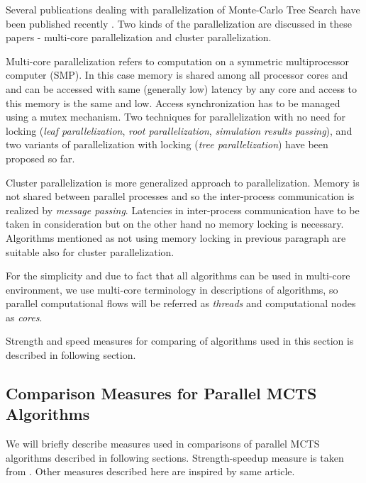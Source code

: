 Several publications dealing with parallelization of Monte-Carlo Tree Search have been published
recently \cites{Cazenave2007}{Chaslot2008}{Teytaud2008}. Two kinds of the parallelization are
discussed in these papers - multi-core parallelization and cluster parallelization.

Multi-core parallelization refers to computation on a symmetric multiprocessor computer (SMP). In
this case memory is shared among all processor cores and and can be accessed with same
(generally low) latency by any core  and access to this memory is the same and low.
Access synchronization has to be managed using a mutex mechanism. Two techniques for
parallelization with no need for locking (\emph{leaf parallelization}, \emph{root parallelization},
\emph{simulation results passing}),
and two variants of parallelization with locking (\emph{tree parallelization}) have been proposed so
far. 

Cluster parallelization is more generalized approach to parallelization. Memory is not shared
between parallel processes and so the inter-process communication is realized by \emph{message
passing}. Latencies in inter-process communication have to be taken in consideration but on the
other hand no memory locking is necessary. Algorithms mentioned as not using memory locking in
previous paragraph are suitable also for cluster parallelization.

For the simplicity and due to fact that all algorithms can be used in multi-core environment, we 
use multi-core terminology in descriptions of algorithms, so parallel
computational flows will be referred as \emph{threads} and computational nodes as \emph{cores}.

Strength and speed measures for comparing of algorithms used in this section is described in
following section.

\subsection{Comparison Measures for Parallel MCTS Algorithms}
\label{sec_measures_parallel}

We will briefly describe measures used in comparisons of parallel MCTS algorithms described in
following sections. Strength-speedup measure is taken from \cite{Chaslot2008}. Other measures
described here are inspired by same article.

